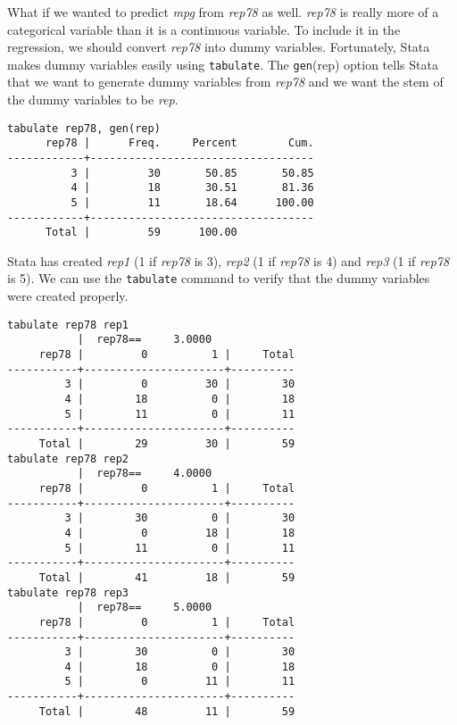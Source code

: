 What if we wanted to predict \textit{mpg} from \textit{rep78} as well. \textit{rep78} is really more of a categorical variable than it is a continuous variable. To include it in the regression, we should convert \textit{rep78} into dummy variables. Fortunately, Stata makes dummy variables easily using \lstinline{tabulate}. The \lstinline{gen}(rep) option tells Stata that we want to generate dummy variables from \textit{rep78} and we want the stem of the dummy variables to be \textit{rep}.

\begin{lstlisting}
tabulate rep78, gen(rep)
      rep78 |      Freq.     Percent        Cum.
------------+-----------------------------------
          3 |         30       50.85       50.85
          4 |         18       30.51       81.36
          5 |         11       18.64      100.00
------------+-----------------------------------
      Total |         59      100.00
\end{lstlisting}

Stata has created \textit{rep1} (1 if \textit{rep78} is 3), \textit{rep2} (1 if \textit{rep78} is 4) and \textit{rep3} (1 if \textit{rep78} is 5). We can use the \lstinline{tabulate} command to verify that the dummy variables were created properly.

\begin{lstlisting}
tabulate rep78 rep1
           |  rep78==     3.0000
     rep78 |         0          1 |     Total
-----------+----------------------+----------
         3 |         0         30 |        30
         4 |        18          0 |        18
         5 |        11          0 |        11
-----------+----------------------+----------
     Total |        29         30 |        59
tabulate rep78 rep2
           |  rep78==     4.0000
     rep78 |         0          1 |     Total
-----------+----------------------+----------
         3 |        30          0 |        30
         4 |         0         18 |        18
         5 |        11          0 |        11
-----------+----------------------+----------
     Total |        41         18 |        59
tabulate rep78 rep3
           |  rep78==     5.0000
     rep78 |         0          1 |     Total
-----------+----------------------+----------
         3 |        30          0 |        30
         4 |        18          0 |        18
         5 |         0         11 |        11
-----------+----------------------+----------
     Total |        48         11 |        59
\end{lstlisting}

